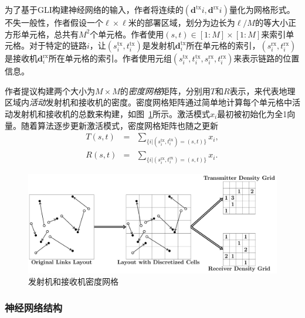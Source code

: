 \documentclass[UTF8, 12pt]{article}
\numberwithin{figure}{section}
\begin{document}
为了基于GLI构建神经网络的输入，作者将连续的$(\mathbf d^{\text{tx}}{i}, \mathbf d^{\text{rx}}{i})$量化为网格形式。不失一般性，作者假设一个$\ell \times \ell$米的部署区域，划分为边长为$\ell/M$的等大小正方形单元格，总共有$M^2$个单元格。作者使用$(s,t)\in[1:M]\times[1:M]$来索引单元格。对于特定的链路$i$，让$(s^\text{tx}_i,t^\text{tx}_i)$是发射机$\mathbf d^\text{tx}_i$所在单元格的索引，$(s^\text{rx}_i,t^\text{rx}_i)$是接收机$\mathbf d^\text{rx}_i$所在单元格的索引。作者使用元组$(s^\text{tx}_i,t^\text{tx}_i,s^\text{rx}_i,t^\text{rx}_i)$来表示链路的位置信息。

作者提议构建两个大小为$M \times M$的\emph{密度网格}矩阵，分别用$T$和$R$表示，来代表地理区域内\emph{活动}发射机和接收机的密度。密度网格矩阵通过简单地计算每个单元格中活动发射机和接收机的总数来构建，如图~\ref{fig:gridexplain}所示。激活模式${ x_i }$最初被初始化为全1向量。随着算法逐步更新激活模式，密度网格矩阵也随之更新
\begin{eqnarray}
  \label{eq:grid_tx}
  T(s,t) & = & \sum_{\{i | (s^\text{tx}_i,t^\text{tx}_i) = (s,t) \}} x_i, \\
  R(s,t) & = & \sum_{\{i | (s^\text{rx}_i,t^\text{rx}_i) = (s,t) \}} x_i.
  \label{eq:grid_rx}
  \end{eqnarray}
  
  \clearpage

  \begin{figure}[htbp]
    \centering
    \centerline{\includegraphics[width=13cm]{fig/GridExplain}}
    \caption{发射机和接收机密度网格}
    \label{fig:gridexplain}
    \end{figure}


\subsubsection{神经网络结构 }
\end{document}

